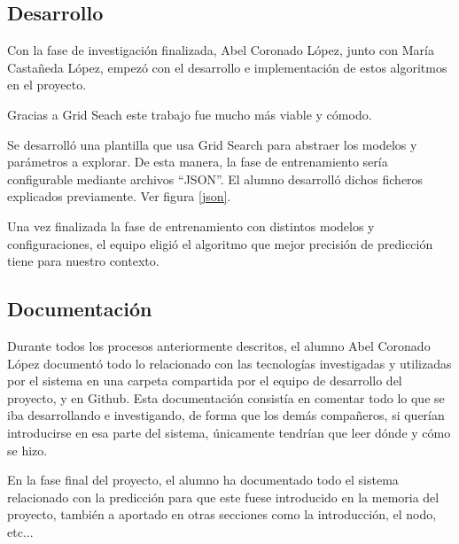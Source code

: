 \subsection{Desarrollo}
Con la fase de investigación finalizada, Abel Coronado López, junto con María Castañeda López, empezó con el desarrollo e implementación de estos algoritmos en el proyecto.

Gracias a Grid Seach este trabajo fue mucho más viable y cómodo.

Se desarrolló una plantilla que usa Grid Search para abstraer los modelos y parámetros a explorar. De esta manera, la fase de entrenamiento sería configurable mediante archivos ``JSON''. El alumno desarrolló dichos ficheros explicados previamente. Ver figura \ref{json}.

Una vez finalizada la fase de entrenamiento con distintos modelos y configuraciones, el equipo eligió el algoritmo que mejor precisión de predicción tiene para nuestro contexto.

\subsection{Documentación}
Durante todos los procesos anteriormente descritos, el alumno Abel Coronado López documentó todo lo relacionado con las tecnologías investigadas y utilizadas por el sistema en una carpeta compartida por el equipo de desarrollo del proyecto, y en Github. Esta documentación consistía en comentar todo lo que se iba desarrollando e investigando, de forma que los demás compañeros, si querían introducirse en esa parte del sistema, únicamente tendrían que leer dónde y cómo se hizo.

En la fase final del proyecto, el alumno ha documentado todo el sistema relacionado con la predicción para que este fuese introducido en la memoria del proyecto, también a aportado en otras secciones como la introducción, el nodo, etc...
